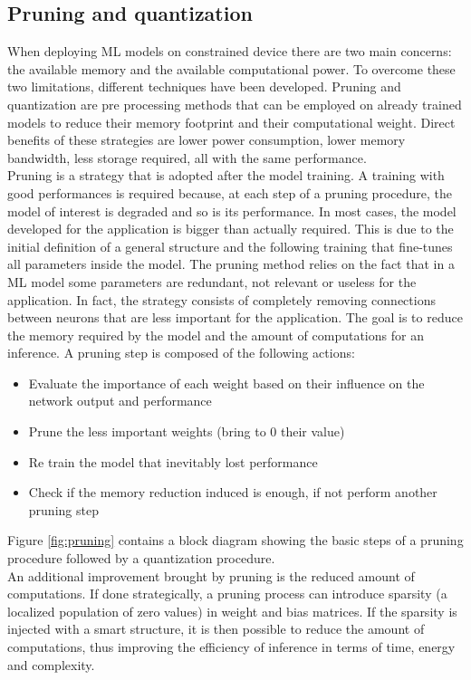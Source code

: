 \documentclass[12pt]{report}
\begin{document}
\subsection{Pruning and quantization}
When deploying ML models on constrained device there are two main concerns: the available memory and the available computational power. To overcome these two limitations, different techniques have been developed. Pruning and quantization are pre processing methods that can be employed on already trained models to reduce their memory footprint and their computational weight. Direct benefits of these strategies are lower power consumption, lower memory bandwidth, less storage required, all with the same performance. \\
Pruning is a strategy that is adopted after the model training. A training with good performances is required because, at each step of a pruning procedure, the model of interest is degraded and so is its performance. In most cases, the model developed for the application is bigger than actually required. This is due to the initial definition of a general structure and the following training that fine-tunes all parameters inside the model. The pruning method relies on the fact that in a ML model some parameters are redundant, not relevant or useless for the application. In fact, the strategy consists of completely removing connections between neurons that are less important for the application. The goal is to reduce the memory required by the model and the amount of computations for an inference. 
A pruning step is composed of the following actions:

\begin{itemize}
\item Evaluate the importance of each weight based on their influence on the network output and performance
\item Prune the less important weights (bring to 0 their value)
\item Re train the model that inevitably lost performance
\item Check if the memory reduction induced is enough, if not perform another pruning step
\end{itemize} 

Figure \ref{fig:pruning} contains a block diagram showing the basic steps of a pruning procedure followed by a quantization procedure.\\
An additional improvement brought by pruning is the reduced amount of computations. If done strategically, a pruning process can introduce sparsity (a localized population of zero values) in weight and bias matrices. If the sparsity is injected with a smart structure, it is then possible to reduce the amount of computations, thus improving the efficiency of inference in terms of time, energy and complexity.\\
\end{document}
